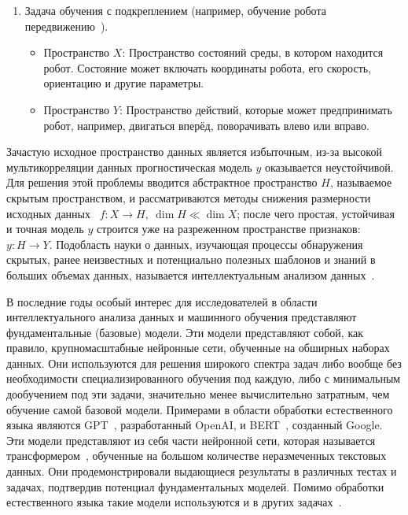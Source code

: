 \begin{enumerate}
    \item Задача обучения с подкреплением (например, обучение робота передвижению~\cite{han, liz, zhangd, machado}).
    \begin{itemize}[label=\textbullet]
        \item Пространство $X$: Пространство состояний среды, в котором находится робот. Состояние может включать координаты робота, его скорость, ориентацию и другие параметры.
        \item Пространство $Y$: Пространство действий, которые может предпринимать робот, например, двигаться вперёд, поворачивать влево или вправо.
    \end{itemize}
\end{enumerate}

Зачастую исходное пространство данных является избыточным, из-за высокой мультикорреляции данных прогностическая модель $y$ оказывается неустойчивой. Для решения этой проблемы вводится абстрактное пространство $H$, называемое скрытым пространством, и рассматриваются методы снижения размерности исходных данных~\cite{isachenko} $f : X \to H, \: \dim H \ll \dim X$; после чего простая, устойчивая и точная модель $y$ строится уже на разреженном пространстве признаков: $y : H \to Y$. Подобласть науки о данных, изучающая процессы обнаружения скрытых, ранее неизвестных и потенциально полезных шаблонов и знаний в больших объемах данных, называется интеллектуальным анализом данных~\cite{fulkerson, franklin, barber, altun}.

В последние годы особый интерес для исследователей в области интеллектуального анализа данных и машинного обучения представляют фундаментальные (базовые) модели. Эти модели представляют собой, как правило, крупномасштабные нейронные сети, обученные на обширных наборах данных. Они используются для решения широкого спектра задач либо вообще без необходимости специализированного обучения под каждую, либо с минимальным дообучением под эти задачи, значительно менее вычислительно затратным, чем обучение самой базовой модели. Примерами в области обработки естественного языка являются GPT~\cite{brown, radford19, radford18}, разработанный OpenAI, и BERT~\cite{devlin}, созданный Google. Эти модели представляют из себя части нейронной сети, которая называется трансформером~\cite{vaswani}, обученные на большом количестве неразмеченных текстовых данных. Они продемонстрировали выдающиеся результаты в различных тестах и задачах, подтвердив потенциал фундаментальных моделей. Помимо обработки естественного языка такие модели используются и в других задачах~\cite{ren, miller, ma, moor}.

